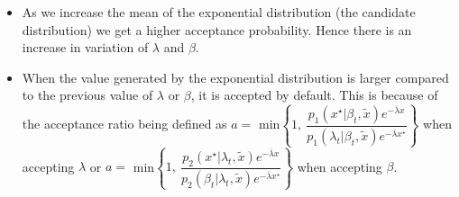 \documentclass[11pt]{article}
\numberwithin{equation}{section}
\begin{document}
\begin{enumerate}
\begin{itemize}
		\item As we increase the mean of the exponential distribution (the candidate distribution) we get a higher acceptance probability. Hence there is an increase in variation of $\lambda$ and $\beta$.

		\item When the value generated by the exponential distribution is larger compared to the previous value of $\lambda$ or $\beta$, it is accepted by default. This is because of the acceptance ratio being defined as $a = $ min$\left\lbrace1,\: \dfrac{p_1\left(x^\star | \beta_t, \widetilde{x} \right) e^{-\overline{\lambda} x}}{p_1\left(\lambda_t | \beta_t, \widetilde{x} \right) e^{-\overline{\lambda} x^\star}}\right\rbrace$ when accepting $\lambda$ or $a = $ min$\left\lbrace1,\: \dfrac{p_2\left(x^\star | \lambda_t, \widetilde{x}\right) e^{-\overline{\lambda} x}}{p_2\left(\beta_t | \lambda_t, \widetilde{x}\right) e^{-\overline{\lambda} x^\star}}\right\rbrace$ when accepting $\beta$.
	\end{itemize}
\end{enumerate}
\end{document}
